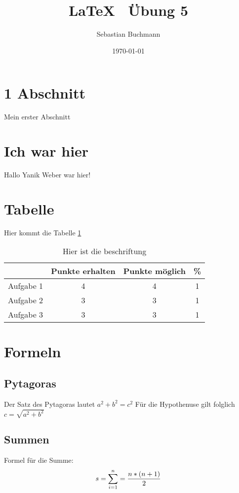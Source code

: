 \documentclass[11pt,a4paper]{article}
\date{\today}
\author{Sebastian Buchmann}
\title{ \LaTeX ~ Übung 5}
\begin{document}
\maketitle
\section{1 Abschnitt}

Mein erster Abschnitt

\section{Ich war hier}
Hallo Yanik Weber war hier!


\section{Tabelle}
Hier kommt die Tabelle \ref{tab:Punkte}
\begin{table} [h]
\centering
\begin{tabular} {c|c|c|c} 

{} & {Punkte erhalten}  & {Punkte möglich} & {\%}   \\
\hline

Aufgabe 1 & 4 & 4 & 1 \\
Aufgabe 2 & 3 & 3 & 1 \\
Aufgabe 3 & 3 & 3 & 1 \\


\end{tabular}

\caption{Hier ist die beschriftung}
\label{tab:Punkte}
\end{table}
\section{Formeln}

\subsection{Pytagoras}
 Der Satz des Pytagoras lautet $ a^2 + b^2 = c^2$ Für die Hypothenuse gilt folglich $c = \sqrt{a^2+b^2}$
 
\subsection{Summen}

Formel für die Summe: \\
\begin{equation}
 s= \sum\limits_{i=1}^{n} = \frac{n*(n+1)}{2}   
\centering
\end{equation}
\end{document}
